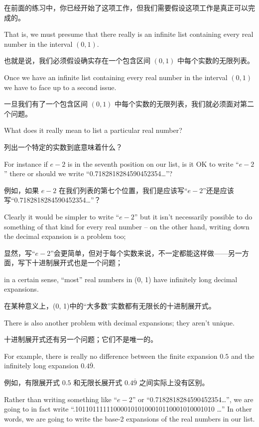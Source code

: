 在前面的练习中，你已经开始了这项工作，但我们需要假设这项工作是真正可以完成的。

That is, we must presume
that there really is an infinite list containing every real number in
the interval $(0, 1)$.

也就是说，我们必须假设确实存在一个包含区间 $(0, 1)$ 中每个实数的无限列表。

Once we have an infinite list containing every real number in the interval
$(0, 1)$ we have to face up to a second issue.

一旦我们有了一个包含区间 $(0, 1)$ 中每个实数的无限列表，我们就必须面对第二个问题。

What does it really mean
to list a particular real number?

列出一个特定的实数到底意味着什么？

For instance if $e-2$ is in the seventh
position on our list, is it OK to write ``$e-2$'' there or should we write
``0.7182818284590452354\ldots''?

例如，如果 $e-2$ 在我们列表的第七个位置，我们是应该写“$e-2$”还是应该写“0.7182818284590452354\ldots”？

Clearly it would be simpler to write
``$e-2$'' but it isn't necessarily possible to do something of that kind
for every real
number -- on the other hand, writing down the decimal expansion is a problem
too;

显然，写“$e-2$”会更简单，但对于每个实数来说，不一定都能这样做——另一方面，写下十进制展开式也是一个问题；

in a certain sense, ``most'' real numbers in (0, 1) have infinitely long
decimal expansions.

在某种意义上，(0, 1)中的“大多数”实数都有无限长的十进制展开式。

There is also another problem with decimal expansions;
they aren't unique.

十进制展开式还有另一个问题；它们不是唯一的。

For example, there is really no difference between the
finite expansion $0.5$ and the infinitely long expansion  $0.4\overline{9}$.

例如，有限展开式 $0.5$ 和无限长展开式 $0.4\overline{9}$ 之间实际上没有区别。

Rather than writing something like ``$e-2$'' or ``0.7182818284590452354\ldots'',
we are going to in fact write ``.1011011111100001010100010110001010001010 \ldots''
In other words, we are going to write the base-2 expansions of the real numbers
in our list.


